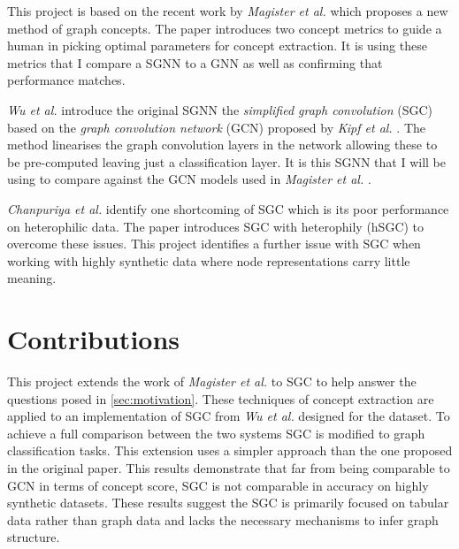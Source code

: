 
This project is based on the recent work by \textit{Magister et al.} \cite{magister2021gcexplainer} which proposes a new method of graph concepts.
The paper introduces two concept metrics to guide a human in picking optimal parameters for concept extraction.
It is using these metrics that I compare a SGNN to a GNN as well as confirming that performance matches.




\textit{Wu et al.} \cite{wu2019simplifying} introduce the original SGNN the \emph{simplified graph convolution} (SGC) based on the \emph{graph convolution network} (GCN) proposed by \textit{Kipf et al.} \cite{kipf2016semi}.
The method linearises the graph convolution layers in the network allowing these to be pre-computed leaving just a classification layer.
It is this SGNN that I will be using to compare against the GCN models used in \textit{Magister et al.} \cite{magister2021gcexplainer}.




\textit{Chanpuriya et al.} \cite{chanpuriya2022simplified} identify one shortcoming of SGC which is its poor performance on heterophilic data.
The paper introduces SGC with heterophily (hSGC) to overcome these issues. 
This project identifies a further issue with SGC when working with highly synthetic data where node representations carry little meaning.


\section{Contributions}


This project extends the work of \textit{Magister et al.} \cite{magister2021gcexplainer} to SGC \cite{wu2019simplifying} to help answer the questions posed in \ref{sec:motivation}.
These techniques of concept extraction are applied to an implementation of SGC from \textit{Wu et al.} designed for the dataset.
To achieve a full comparison between the two systems SGC is modified to graph classification tasks. 
This extension uses a simpler approach than the one proposed in the original paper.
This results demonstrate that far from being comparable to GCN in terms of concept score, SGC is not comparable in accuracy on highly synthetic datasets.
These results suggest the SGC is primarily focused on tabular data rather than graph data and lacks the necessary mechanisms to infer graph structure.

